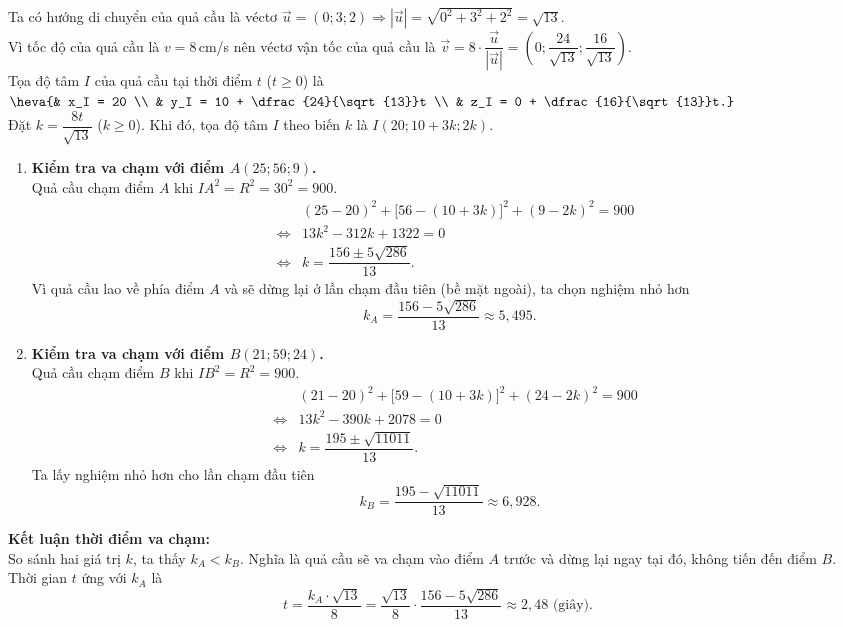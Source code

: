 \begin{ex}
{\begin{center}
		\end{center}
		Ta có hướng di chuyển của quả cầu là véctơ $\overrightarrow{u} = (0;3;2) \Rightarrow |\overrightarrow{u}| = \sqrt{0^2 + 3^2 + 2^2} = \sqrt{13}$.\\
		Vì tốc độ của quả cầu là $v = 8$\,cm/s nên véctơ vận tốc của quả cầu là
		$\overrightarrow{v} = 8 \cdot \dfrac{\overrightarrow{u}}{|\overrightarrow{u}|} = \left( 0 ; \dfrac{24}{\sqrt{13}} ; \dfrac{16}{\sqrt{13}} \right)$.\\
		Tọa độ tâm $I$ của quả cầu tại thời điểm $t$ ($t \ge 0$) là
		$ \heva{& x_I = 20 \\ & y_I = 10 + \dfrac{24}{\sqrt{13}}t \\ & z_I = 0 + \dfrac{16}{\sqrt{13}}t.}$\\
		Đặt $k = \dfrac{8t}{\sqrt{13}}$ ($k \ge 0$). Khi đó, tọa độ tâm $I$ theo biến $k$ là $I(20; 10 + 3k; 2k)$.
		\begin{enumerate}[\it TH 1:]
			\item \textbf{Kiểm tra va chạm với điểm $A(25; 56; 9)$.}\\
			Quả cầu chạm điểm $A$ khi $IA^2 = R^2 = 30^2 = 900$.
			\allowdisplaybreaks
			\begin{eqnarray*}
				&& (25 - 20)^2 + \big[56 - (10 + 3k)\big]^2 + (9 - 2k)^2 = 900\\
				&\Leftrightarrow& 13k^2 - 312k + 1322 = 0\\
				&\Leftrightarrow& k=\dfrac{156 \pm 5\sqrt{286}}{13}.
			\end{eqnarray*}
			Vì quả cầu lao về phía điểm $A$ và sẽ dừng lại ở lần chạm đầu tiên (bề mặt ngoài), ta chọn nghiệm nhỏ hơn
			\[ k_A = \dfrac{156 - 5\sqrt{286}}{13} \approx 5{,}495. \]
			\item \textbf{Kiểm tra va chạm với điểm $B(21; 59; 24)$.}\\
			Quả cầu chạm điểm $B$ khi $IB^2 = R^2 = 900$.
			\begin{eqnarray*}
				&& (21 - 20)^2 + \big[59 - (10 + 3k)\big]^2 + (24 - 2k)^2 = 900\\
				&\Leftrightarrow& 13k^2 - 390k + 2078 = 0\\
				&\Leftrightarrow& k = \dfrac{195 \pm \sqrt{11011}}{13}.
			\end{eqnarray*}
			Ta lấy nghiệm nhỏ hơn cho lần chạm đầu tiên
			\[ k_B = \dfrac{195 - \sqrt{11011}}{13} \approx 6{,}928.\]
		\end{enumerate}
		\textbf{Kết luận thời điểm va chạm:} \\
		So sánh hai giá trị $k$, ta thấy $k_A < k_B$. Nghĩa là quả cầu sẽ va chạm vào điểm $A$ trước và dừng lại ngay tại đó, không tiến đến điểm $B$.\\
		Thời gian $t$ ứng với $k_A$ là
		\[ t = \dfrac{k_A \cdot \sqrt{13}}{8} = \dfrac{\sqrt{13}}{8} \cdot \dfrac{156 - 5\sqrt{286}}{13} \approx 2{,}48 \text{ (giây)}. \]
	}
\end{ex}

